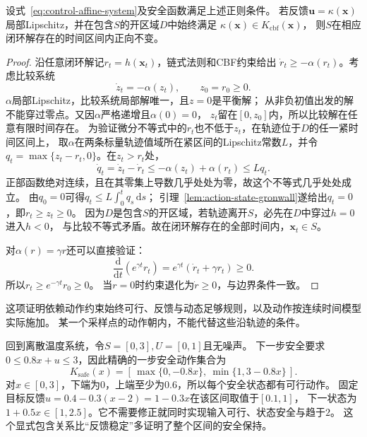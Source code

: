 \begin{theorem}[CBF条件保证正向不变]
\label{thm:control-cbf-invariance}
设式~\eqref{eq:control-affine-system}及安全函数满足上述正则条件。
若反馈$\bm u=\kappa(\bm x)$局部Lipschitz，并在包含$S$的开区域$D$中始终满足
$\kappa(\bm x)\in K_{\mathrm{cbf}}(\bm x)$，
则$S$在相应闭环解存在的时间区间内正向不变。
\end{theorem}
\begin{proof}
沿任意闭环解记$r_t=h(\bm x_t)$，链式法则和CBF约束给出
$\dot r_t\geq-\alpha(r_t)$。考虑比较系统
\[
  \dot z_t=-\alpha(z_t),\qquad z_0=r_0\geq0.
\]
$\alpha$局部Lipschitz，比较系统局部解唯一，且$z=0$是平衡解；
从非负初值出发的解不能穿过零点。又因$\alpha$严格递增且$\alpha(0)=0$，
$z_t$留在$[0,z_0]$内，所以比较解在任意有限时间存在。
为验证微分不等式中的$r_t$也不低于$z_t$，在轨迹位于$D$的任一紧时间区间上，
取$\alpha$在两条标量轨迹值域所在紧区间的Lipschitz常数$L$，并令
$q_t=\max\{z_t-r_t,0\}$。在$z_t>r_t$处，
\[
 \dot q_t=\dot z_t-\dot r_t
 \leq-\alpha(z_t)+\alpha(r_t)\leq Lq_t.
\]
正部函数绝对连续，且在其零集上导数几乎处处为零，故这个不等式几乎处处成立。
由$q_0=0$可得$q_t\leq L\int_0^tq_s\,\mathrm ds$；
引理~\ref{lem:action-state-gronwall}遂给出$q_t=0$，即$r_t\geq z_t\geq0$。
因为$D$是包含$S$的开区域，若轨迹离开$S$，必先在$D$中穿过$h=0$进入$h<0$，
与比较不等式矛盾。故在闭环解存在的全部时间内，$\bm x_t\in S$。

对$\alpha(r)=\gamma r$还可以直接验证：
\[
  \frac{\mathrm d}{\mathrm dt}(e^{\gamma t}r_t)
  =e^{\gamma t}(\dot r_t+\gamma r_t)\geq0.
\]
所以$r_t\geq e^{-\gamma t}r_0\geq0$。
当$r=0$时约束退化为$\dot r\geq0$，与边界条件一致。
\end{proof}
这项证明依赖动作约束始终可行、反馈与动态足够规则，以及动作按连续时间模型实际施加。
某一个采样点的动作朝内，不能代替这些沿轨迹的条件。

回到离散温度系统，令$S=[0,3],U=[0,1]$且无噪声。
下一步安全要求$0\leq0.8x+u\leq3$，因此精确的一步安全动作集合为
\begin{equation}
  K_{\mathrm{safe}}(x)
  =[\,\max\{0,-0.8x\},\ \min\{1,3-0.8x\}\,].
  \label{eq:control-temperature-safe-actions}
\end{equation}
对$x\in[0,3]$，下端为$0$，上端至少为$0.6$，所以每个安全状态都有可行动作。
固定目标反馈$u=0.4-0.3(x-2)=1-0.3x$在该区间取值于$[0.1,1]$，
下一状态为$1+0.5x\in[1,2.5]$。它不需要修正就同时实现输入可行、状态安全与趋于$2$。
这个显式包含关系比“反馈稳定”多证明了整个区间的安全保持。

